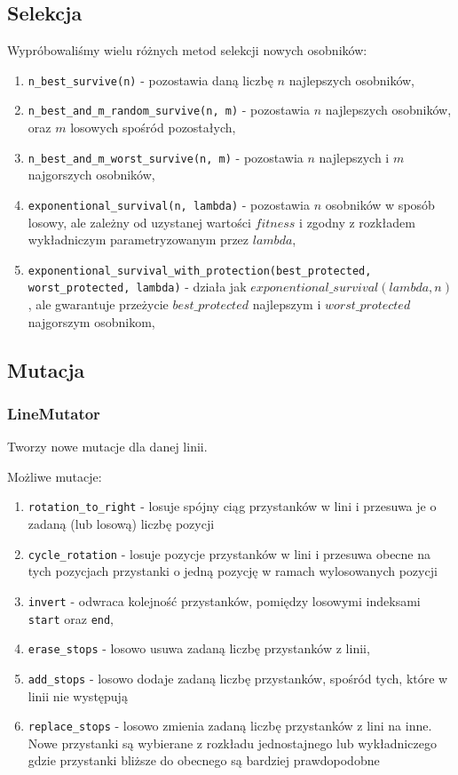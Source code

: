 \documentclass[12pt,a4paper]{article}
\begin{document}
\subsection{Selekcja}
\label{sec:selection}
Wypróbowaliśmy wielu różnych metod selekcji nowych osobników:
\begin{enumerate}
    \item \lstinline{n_best_survive(n)} - pozostawia daną liczbę $n$ najlepszych osobników,
    \item \lstinline{n_best_and_m_random_survive(n, m)} - pozostawia $n$ najlepszych osobników, oraz $m$ losowych spośród pozostałych,
    \item \lstinline{n_best_and_m_worst_survive(n, m)} - pozostawia $n$ najlepszych i $m$ najgorszych osobników,
    \item \lstinline{exponentional_survival(n, lambda)} - pozostawia $n$ osobników w sposób losowy, ale zależny od uzystanej wartości $fitness$ i zgodny z rozkładem wykładniczym parametryzowanym przez $lambda$,
    \item \lstinline{exponentional_survival_with_protection(best_protected, worst_protected, lambda)} - działa jak $exponentional\_survival(lambda, n)$, ale gwarantuje przeżycie $best\_protected$ najlepszym i $worst\_protected$ najgorszym osobnikom,
\end{enumerate}

\subsection{Mutacja}

\subsubsection{LineMutator}
Tworzy nowe mutacje dla danej linii.

Możliwe mutacje:

\begin{enumerate}
    \item \lstinline{rotation_to_right} - losuje spójny ciąg przystanków w lini i przesuwa je o zadaną (lub losową) liczbę pozycji
    \item \lstinline{cycle_rotation} - losuje pozycje przystanków w lini i przesuwa obecne na tych pozycjach przystanki o jedną pozycję w ramach wylosowanych pozycji
    \item \lstinline{invert} - odwraca kolejność przystanków, pomiędzy losowymi indeksami \lstinline{start} oraz \lstinline{end},
    \item \lstinline{erase_stops} - losowo usuwa zadaną liczbę przystanków z linii,
    \item \lstinline{add_stops} - losowo dodaje zadaną liczbę przystanków, spośród tych, które w linii nie występują
    \item \lstinline{replace_stops} - losowo zmienia zadaną liczbę przystanków z lini na inne. Nowe przystanki są wybierane z rozkładu jednostajnego lub wykładniczego gdzie przystanki bliższe do obecnego są bardziej prawdopodobne
\end{enumerate}
\end{document}

